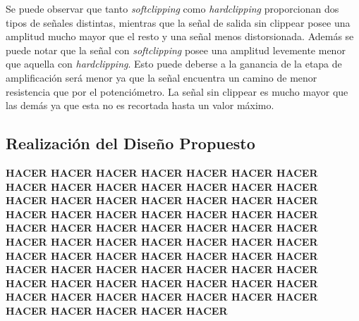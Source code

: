 Se puede observar que tanto \textit{softclipping} como \textit{hardclipping} proporcionan dos tipos de señales distintas, mientras que la señal de salida sin clippear posee una amplitud mucho mayor que el resto y una señal menos distorsionada. Además se puede notar que la señal con \textit{softclipping} posee una amplitud levemente menor que aquella con \textit{hardclipping}. Esto puede deberse a la ganancia de la etapa de amplificación será menor ya que la señal encuentra un camino de menor resistencia que por el potenciómetro. La señal sin clippear es mucho mayor que las demás ya que esta no es recortada hasta un valor máximo.

\subsection{Realización del Diseño Propuesto}

\textbf{HACER HACER HACER HACER HACER HACER HACER HACER HACER HACER HACER HACER HACER HACER HACER HACER HACER HACER HACER HACER HACER HACER HACER HACER HACER HACER HACER HACER HACER HACER HACER HACER HACER HACER HACER HACER HACER HACER HACER HACER HACER HACER HACER HACER HACER HACER HACER HACER HACER HACER HACER HACER HACER HACER HACER HACER HACER HACER HACER HACER HACER HACER HACER HACER HACER HACER HACER HACER HACER HACER HACER HACER HACER HACER HACER }

